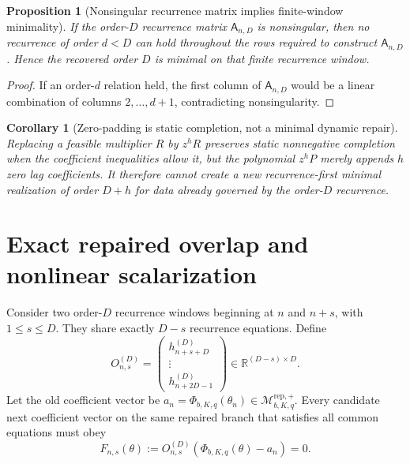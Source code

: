 \documentclass[11pt]{amsart}
\numberwithin{equation}{section}
\theoremstyle{plain}
\newtheorem{proposition}[theorem]{Proposition}
\newtheorem{corollary}[theorem]{Corollary}
\theoremstyle{definition}
\theoremstyle{remark}
\begin{document}
\begin{proposition}[Nonsingular recurrence matrix implies finite-window minimality]
\label{prop:v9_hankel_minimality}
If the order-$D$ recurrence matrix $\mathsf A_{n,D}$ is nonsingular, then no recurrence of order
$d<D$ can hold throughout the rows required to construct $\mathsf A_{n,D}$.  Hence the recovered
order $D$ is minimal on that finite recurrence window.
\end{proposition}

\begin{proof}
If an order-$d$ relation held, the first column of $\mathsf A_{n,D}$ would be a linear combination
of columns $2,\ldots,d+1$, contradicting nonsingularity.
\end{proof}

\begin{corollary}[Zero-padding is static completion, not a minimal dynamic repair]
\label{cor:v9_zero_padding_nonminimal}
Replacing a feasible multiplier $R$ by $z^hR$ preserves static nonnegative completion when the
coefficient inequalities allow it, but the polynomial $z^hP$ merely appends $h$ zero lag
coefficients.  It therefore cannot create a new recurrence-first minimal realization of order
$D+h$ for data already governed by the order-$D$ recurrence.
\end{corollary}

\section{Exact repaired overlap and nonlinear scalarization}
\label{sec:repaired_overlap}

Consider two order-$D$ recurrence windows beginning at $n$ and $n+s$, with $1\leq s\leq D$. They share exactly $D-s$ recurrence equations. Define
\begin{equation}
O^{(D)}_{n,s}=\begin{pmatrix}h^{(D)}_{n+s+D}\\ \vdots\\ h^{(D)}_{n+2D-1}\end{pmatrix}\in\mathbb R^{(D-s)\times D}.
\label{eq:repaired_overlap_matrix}
\end{equation}
Let the old coefficient vector be $a_n=\Phi_{b,K,q}(\theta_n)\in\mathcal M^{\mathrm{rep},+}_{b,K,q}$. Every candidate next coefficient vector on the same repaired branch that satisfies all common equations must obey
\begin{equation}
F_{n,s}(\theta):=O^{(D)}_{n,s}\left(\Phi_{b,K,q}(\theta)-a_n\right)=0.
\label{eq:repaired_overlap_map}
\end{equation}
\end{document}
